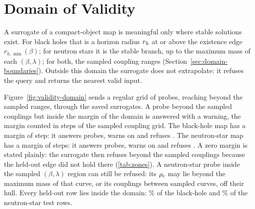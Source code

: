 \section{Domain of Validity}
\label{sec:validity}

A surrogate of a compact-object map is meaningful only where stable solutions exist. For black holes that is a horizon radius $r_h$ at or above the existence edge $r_{h,\min}(\beta)$; for neutron stars it is the stable branch, up to the maximum mass of each $(\beta, \lambda)$; for both, the sampled coupling ranges (Section~\ref{sec:domain-boundaries}). Outside this domain the surrogate does not extrapolate: it refuses the query and returns the nearest valid input.

Figure~\ref{fig:validity-domain} sends a regular grid of probes, reaching beyond the sampled ranges, through the saved surrogates. A probe beyond the sampled couplings but inside the margin of the domain is answered with a warning, the margin counted in steps of the sampled coupling grid. The black-hole map has a margin of \validityBhMarginSteps{} step: it answers \validityBhAnswered{} probes, warns on \validityBhWarned{} and refuses \validityBhRefused{}. The neutron-star map has a margin of \validityNsMarginSteps{} steps: it answers \validityNsAnswered{} probes, warns on \validityNsWarned{} and refuses \validityNsRefused{}. A zero margin is stated plainly: the surrogate then refuses beyond the sampled couplings because the held-out edge did not hold there (\cref{tab:zones}). A neutron-star probe inside the sampled $(\beta, \lambda)$ region can still be refused: its $\rho_c$ may lie beyond the maximum mass of that curve, or its couplings between sampled curves, off their hull. Every held-out row lies inside the domain: \validityBhTestInside\% of the \validityBhTestRows{} black-hole and \validityNsTestInside\% of the \validityNsTestRows{} neutron-star test rows.

